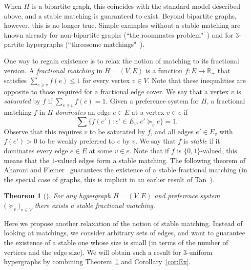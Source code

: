 \documentclass{article}
\newtheorem{theorem}{Theorem}[section]
\theoremstyle{definition}
\begin{document}
When $H$ is a bipartite graph, this coincides with the standard model described above, and a stable matching is guaranteed to exist. Beyond bipartite graphs, however, this is no longer true. Simple examples without a stable matching are known already for non-bipartite graphs (``the roommates problem"~\cite{GS}) and for $3$-partite hypergraphs (``threesome matchings"~\cite{Al}).

One way to regain existence is to relax the notion of matching to its fractional version. A \emph{fractional matching} in $H = (V, E)$ is a function $f: E \to \mathbb{R}_+$ that satisfies $\sum_{e \ni v} f(e) \le 1$ for every vertex $v \in V$. Note that these inequalities are opposite to those required for a fractional edge cover. We say that a vertex $v$ is \emph{saturated} by $f$ if $\sum_{e \ni v} f(e) = 1$. Given a preference system for $H$, a fractional matching $f$ in $H$ \emph{dominates} an edge $e \in E$ at a vertex $v \in e$ if \[ \sum \{ f(e'): e' \in E_v, e' \succeq_v e\} = 1.\] Observe that this requires $v$ to be saturated by $f$, and all edges $e' \in E_v$ with $f(e') > 0$ to be weakly preferred to $e$ by $v$. We say that $f$ is \emph{stable} if it dominates every edge $e \in E$ at some $v \in e$. Note that if $f$ is $\{0,1\}$-valued, this means that the $1$-valued edges form a stable matching. The following theorem of Aharoni and Fleiner~\cite{AF} guarantees the existence of a stable fractional matching (in the special case of graphs, this is implicit in an earlier result of Tan~\cite{Tan}).
\begin{theorem}[{\cite{AF}}] \label{thm:AF}
For any hypergraph $H = (V, E)$ and preference system $\bigl( \succeq_v\bigr)_{v \in V}$ there exists a stable fractional matching.
\end{theorem}
Here we propose another relaxation of the notion of stable matching. Instead of looking at matchings, we consider arbitrary sets of edges, and want to guarantee the existence of a stable one whose size is small (in terms of the number of vertices and the edge size). We will obtain such a result for $3$-uniform hypergraphs by combining Theorem~\ref{thm:AF} and Corollary~\ref{cor:Ex}.
\end{document}
